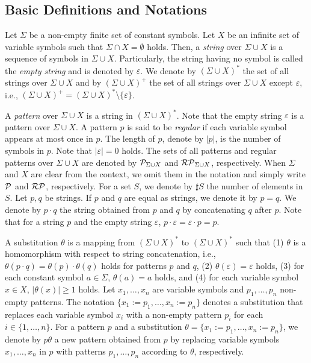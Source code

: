
\subsection{Basic Definitions and Notations}\label{subsec:basicdef}

Let $\Sigma$ be a non-empty finite set of constant symbols.
Let $X$ be an infinite set of variable symbols such that $\Sigma \cap X = \emptyset$ holds.
Then, a \textit{string} {\color{red}over} $\Sigma \cup X$ is a sequence of symbols in $\Sigma \cup X$.
Particularly, the string having no symbol is called the \textit{empty string} and is denoted by $\varepsilon$.
We denote by $(\Sigma \cup X)^{\ast}$ the set of all strings {\color{red}over} $\Sigma \cup X$ 
and by $(\Sigma \cup X)^{+}$ the set of all strings {\color{red}over} $\Sigma\cup X$ except $\varepsilon$, i.e., $(\Sigma \cup X)^{+}=(\Sigma \cup X)^{\ast}\setminus \{\varepsilon\}$.

A \textit{pattern} {\color{red}over} $\Sigma \cup X$ is a string in $(\Sigma \cup X)^{\ast}$.
Note that the empty string $\varepsilon$ is a pattern {\color{red}over} $\Sigma \cup X$.
A pattern $p$ is said to be \textit{regular} if each variable symbol appears
at most once in $p$.
The length of $p$, denote by $|p|$, is the number of symbols in $p$.
Note that $|\varepsilon|=0$ holds.
{\color{red} The sets of all patterns and regular patterns {\color{red}over} $\Sigma \cup X$ are denoted by $\mathcal{P}_{\Sigma\cup X}$ and $\mathcal{RP}_{\Sigma\cup X}$, respectively.
When $\Sigma$ and $X$ are clear from the context, 
we omit them in the notation and simply write $\mathcal{P}$ and $\mathcal{RP}$, respectively.}
For a set $S$, we denote by $\sharp S$ the number of elements in $S$.
Let $p,q$ be strings.
If $p$ and $q$ are equal as strings, we denote it by $p=q$.
We denote by $p\cdot q$ the string obtained from $p$ and $q$ by concatenating $q$ after $p$.
Note that for a string $p$ and the empty string $\varepsilon$, $p\cdot \varepsilon = \varepsilon \cdot p = p$.

A substitution $\theta$ is a mapping from $(\Sigma \cup X)^{\ast}$ to $(\Sigma \cup X)^{\ast}$ such that
(1) $\theta$ is a homomorphism with respect to string concatenation, i.e., $\theta(p \cdot q) = \theta(p) \cdot \theta(q)$ holds for patterns $p$ and $q$,
(2) $\theta(\varepsilon)=\varepsilon$ holds,
(3) for each constant symbol $a \in \Sigma$, $\theta(a) = a$ holds,
and (4) for each variable symbol $x \in X$, $|\theta(x)| \geq 1$ holds.
Let $x_{1},\ldots,x_{n}$ are variable symbols and $p_{1},\ldots,p_{n}$ non-empty patterns.
The notation $\{x_{1}:=p_{1},\ldots,x_{n}:=p_{n}\}$ denotes a substitution that replaces each variable symbol $x_{i}$
with a non-empty pattern $p_{i}$ for each $i \in \{1,\ldots,n\}$.
For a pattern $p$ and a substitution $\theta=\{x_{1}:=p_{1},\ldots,x_{n}:=p_{n}\}$, we denote by $p\theta$ a new pattern obtained from $p$ by replacing variable symbols $x_1,\ldots,x_n$ in $p$ with patterns $p_1,\ldots,p_n$ according to $\theta$, respectively.

